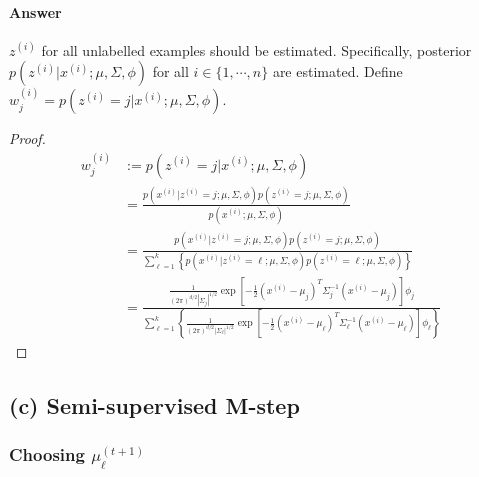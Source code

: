 \documentclass[11pt]{article}
\newcommand{\upi}[0]{^{(i)}}
\begin{document}
	\paragraph{Answer} $z\upi$ for all unlabelled examples should be estimated. Specifically, posterior $p(z\upi | x\upi; \mu, \Sigma, \phi)$ for all $i \in \{1,\cdots,n\}$ are estimated. Define $w\upi_j = p(z\upi = j | x\upi; \mu, \Sigma, \phi)$.
	\begin{proof}
		\begin{align}
		w\upi_j &:= p(z\upi = j| x\upi; \mu, \Sigma, \phi) \\
		&= \frac{p(x\upi|z\upi = j; \mu, \Sigma, \phi) p(z\upi = j; \mu, \Sigma, \phi)}{p(x\upi; \mu, \Sigma, \phi)} \\
		&= \frac{p(x\upi|z\upi = j; \mu, \Sigma, \phi) p(z\upi = j; \mu, \Sigma, \phi)}{\sum_{\ell=1}^k \left \{p(x\upi|z\upi = \ell; \mu, \Sigma, \phi) p(z\upi = \ell; \mu, \Sigma, \phi) \right\}} \\
		&= \frac{
		 \frac{1}{(2\pi)^{d/2} |\Sigma_j|^{1/2}} \exp \left[
		 	- \frac{1}{2} (x\upi - \mu_j)^T \Sigma_j^{-1} (x\upi - \mu_j) \right] \phi_j
		}{
		 \sum_{\ell=1}^k \left\{
		 	\frac{1}{(2\pi)^{d/2} |\Sigma_\ell|^{1/2}} \exp \left[
		 	- \frac{1}{2} (x\upi - \mu_\ell)^T \Sigma_\ell^{-1} (x\upi - \mu_\ell)\right] \phi_\ell
		 \right\}
		}
		\end{align}
	\end{proof}
	
	\newpage
	\subsection{(c) Semi-supervised M-step}
	\subsubsection{Choosing $\mu_\ell^{(t+1)}$}
\end{document}
